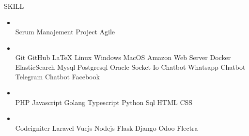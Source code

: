 

\begin{tcolorbox}
    [
    width=\textwidth, 
    colframe=WhiteSmoke,
    colback=LinkedInBlue,
    arc=1mm,
    ]
    \color{WhiteSmoke}
    \centerline{\Large SKILL}
\end{tcolorbox}


\begin{itemize}


    \item {\color{LinkedInBlue} }\\
    {
    Scrum Manajement Project \mybullet Agile
    }


    \item {\color{LinkedInBlue} }\\
    {
    Git \mybullet
    GitHub \mybullet
    LaTeX \mybullet
    Linux \mybullet
    Windows \mybullet
    MacOS \mybullet
    Amazon Web Server \mybullet
    Docker \mybullet
    ElasticSearch \mybullet
    Mysql \mybullet
    Postgresql \mybullet
    Oracle \mybullet
    Socket Io \mybullet
    Chatbot Whatsapp \mybullet
    Chatbot Telegram \mybullet
    Chatbot Facebook
    }


    \item {\color{LinkedInBlue} }\\
    {
    PHP \mybullet
    Javascript \mybullet
    Golang \mybullet
    Typescript \mybullet
    Python \mybullet
    Sql \mybullet
    HTML \mybullet
    CSS
    }


    \item {\color{LinkedInBlue} }\\
    {
    Codeigniter \mybullet
    Laravel \mybullet
    Vuejs \mybullet
    Nodejs \mybullet
    Flask \mybullet
    Django \mybullet
    Odoo \mybullet
    Flectra
    }


\end{itemize}
